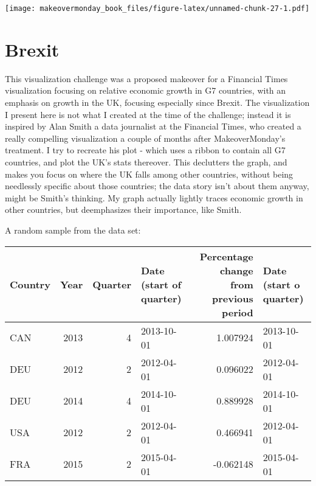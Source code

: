 \documentclass[]{book}
\theoremstyle{definition}
\theoremstyle{definition}
\theoremstyle{definition}
\theoremstyle{remark}
\begin{document}
\texttt{[image: makeovermonday\_book\_files/figure-latex/unnamed-chunk-27-1.pdf]}

\chapter{Brexit}\label{brexit}

This visualization challenge was a proposed makeover for a Financial
Times visualization focusing on relative economic growth in G7
countries, with an emphasis on growth in the UK, focusing especially
since Brexit. The visualization I present here is not what I created at
the time of the challenge; instead it is inspired by Alan Smith a data
journalist at the Financial Times, who created a really compelling
visualization a couple of months after MakeoverMonday's treatment. I try
to recreate his plot - which uses a ribbon to contain all G7 countries,
and plot the UK's stats thereover. This declutters the graph, and makes
you focus on where the UK falls among other countries, without being
needlessly specific about those countries; the data story isn't about
them anyway, might be Smith's thinking. My graph actually lightly traces
economic growth in other countries, but deemphasizes their importance,
like Smith.

A random sample from the data set:

\begin{tabular}{l|r|r|l|r|l}
\hline
Country & Year & Quarter & Date (start of quarter) & Percentage change from previous period & Date (start o quarter)\\
\hline
CAN & 2013 & 4 & 2013-10-01 & 1.007924 & 2013-10-01\\
\hline
DEU & 2012 & 2 & 2012-04-01 & 0.096022 & 2012-04-01\\
\hline
DEU & 2014 & 4 & 2014-10-01 & 0.889928 & 2014-10-01\\
\hline
USA & 2012 & 2 & 2012-04-01 & 0.466941 & 2012-04-01\\
\hline
FRA & 2015 & 2 & 2015-04-01 & -0.062148 & 2015-04-01\\
\hline
\end{tabular}
\end{document}

